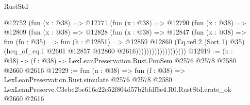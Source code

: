 \begin{lexlean}{RustStd}
\begin{coremodule}
                          @12752
                            (fun (x : @38) =>
                            @12771
                              (fun (x : @38) =>
                              @12790
                                (fun (x : @38) =>
                                @12809
                                  (fun (x : @38) =>
                                  @12828
                                    (fun (x : @38) =>
                                    @12847
                                      (fun (x : @38) =>
                                      fun (fn : @35) =>
                                      fun (h : @12851) =>
                                      @12859
                                        @12860
                                        (Eq.refl.{2} (Sort 1) @35)
                                        (heq_of_eq.{1} @2601 @12857 @12860 @2616)))))))))))))))))))
@12919 := (n : @38) -> (f : @38) -> LexLeanPreservation.Rust.FunSem @2576 @2578 @2580 @2660 @2616
@12929 := fun (n : @38) =>
  fun (f : @38) =>
  LexLeanPreservation.Rust.simulate
    @2576
    @2578
    @2580
    LexLeanPreserve.C3ebc2be616e22c52f804d57b2bfdf6e4.R0.RustStd.crate_ok
    @2660
    @2616
\end{coremodule}
\end{lexlean}
